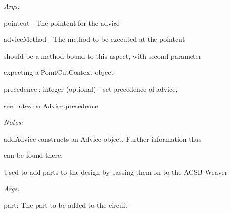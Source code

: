 \documentclass[letterpaper,10pt,english]{sphinxmanual}
\begin{document}
\begin{fulllineitems}
\begin{fulllineitems}
\begin{DUlineblock}{0em}
\item[] \emph{Args:}
\item[]
\begin{DUlineblock}{\DUlineblockindent}
\item[] pointcut - The pointcut for the advice
\item[] adviceMethod - The method to be executed at the pointcut
\item[]
\begin{DUlineblock}{\DUlineblockindent}
\item[] should be a method bound to this aspect, with second parameter
\item[] expecting a PointCutContext object
\end{DUlineblock}
\item[] precedence : integer (optional) - set precedence of advice,
\item[]
\begin{DUlineblock}{\DUlineblockindent}
\item[] see notes on Advice.precedence
\end{DUlineblock}
\end{DUlineblock}
\end{DUlineblock}

\begin{DUlineblock}{0em}
\item[] \emph{Notes:}
\item[]
\begin{DUlineblock}{\DUlineblockindent}
\item[] addAdvice constructs an Advice object. Further information thus
\item[] can be found there.
\end{DUlineblock}
\end{DUlineblock}

\end{fulllineitems}


\begin{fulllineitems}
\label{modules/index:aosb.core.Aspect.addPart}
Used to add parts to the design by passing them on to the AOSB Weaver

\begin{DUlineblock}{0em}
\item[] \emph{Args:}
\item[]
\begin{DUlineblock}{\DUlineblockindent}
\item[] part: The part to be added to the circuit
\end{DUlineblock}
\end{DUlineblock}


\end{fulllineitems}
\end{fulllineitems}
\end{document}
